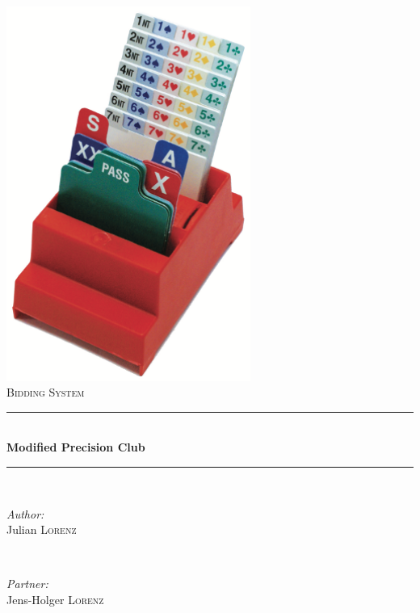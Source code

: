 \begin{titlepage}

\newcommand{\HRule}{\rule{\linewidth}{0.5mm}} %

\center %

\label{Heading}
\includegraphics[width=8cm]{pictures/box_1.png}\\[1.5cm] %
\textsc{\Large Bidding System}\\[0.5cm] %

\label{Title Section}
\HRule \\[0.5cm]
{ \huge \bfseries Modified Precision Club}\\[0.3cm] %
\HRule \\[1.5cm]

\label{Author}
\begin{minipage}{0.4\textwidth}
\begin{flushleft} \large
\emph{Author:}\\
Julian \textsc{Lorenz}
\end{flushleft}
\end{minipage}
~
\begin{minipage}{0.4\textwidth}
\begin{flushright} \large
\emph{Partner:} \\
Jens-Holger \textsc{Lorenz}


\end{flushright}
\end{minipage}
\end{titlepage}

